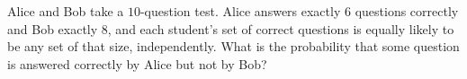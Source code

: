 Alice and Bob take a $10$-question test. Alice answers exactly $6$ questions correctly and Bob exactly $8$, and each student's set of correct questions is equally likely to be any set of that size, independently. What is the probability that some question is answered correctly by Alice but not by Bob?
